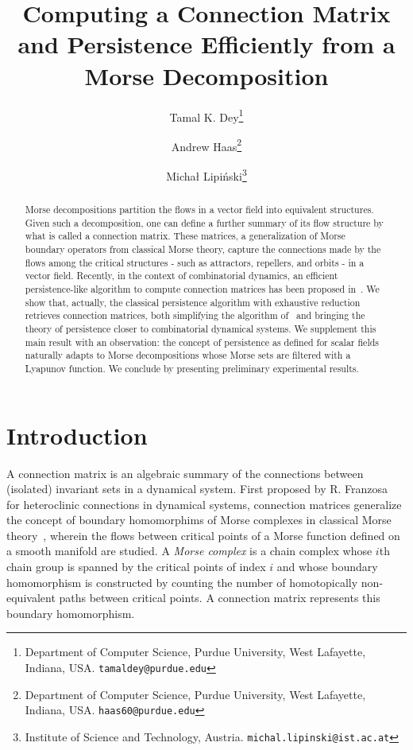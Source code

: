\documentclass[a4paper,english,cleveref]{article}
\title{Computing a Connection Matrix and Persistence Efficiently from a Morse Decomposition}
\author{Tamal K. Dey\thanks{Department of Computer Science, Purdue University, West Lafayette, Indiana, USA. \texttt{tamaldey@purdue.edu}}
\and Andrew Haas\thanks{Department of Computer Science, Purdue University, West Lafayette, Indiana, USA. \texttt{haas60@purdue.edu}}
\and Micha\l{} Lipi\'nski\thanks{Institute of Science and Technology, Austria.
\texttt{michal.lipinski@ist.ac.at}}
}
\theoremstyle{plain}
\newcounter{li}
\begin{document}
\maketitle

\begin{abstract}
Morse decompositions partition the flows in a vector field into equivalent
structures. Given such a decomposition, one can define a further summary
of its flow structure by what is called a connection matrix.
These matrices, a generalization of Morse boundary operators from classical Morse theory, capture the connections made by the flows among the critical structures - such as attractors, repellers, and orbits - in a vector field. Recently, in the context of combinatorial dynamics, an efficient persistence-like algorithm to compute connection matrices 
has been proposed in~\cite{DLMS24}. We show that, actually, the classical persistence algorithm with exhaustive reduction retrieves connection matrices, both simplifying the
algorithm of~\cite{DLMS24} and bringing the theory of persistence closer to combinatorial dynamical systems. We supplement this main result with an observation:
the concept of persistence as defined for scalar fields naturally adapts to
Morse decompositions whose Morse sets are filtered with a Lyapunov function.
We conclude by presenting preliminary experimental results.

\end{abstract}
\section{Introduction}

A connection matrix is an algebraic summary of the connections between (isolated) invariant sets in a dynamical system. First proposed by R. Franzosa~\cite{Fr1986,Fr1989} for heteroclinic connections in dynamical systems, connection matrices generalize the concept of boundary homomorphims of Morse complexes in classical Morse theory~\cite{K2015}, wherein the flows between critical points of a Morse function defined on a smooth manifold are studied. A \emph{Morse complex} is a chain complex whose $i$th chain group is spanned by the critical points of index $i$ and whose boundary homomorphism is constructed by counting the number of homotopically non-equivalent paths between critical points. A connection matrix represents this boundary homomorphism.
\end{document}
